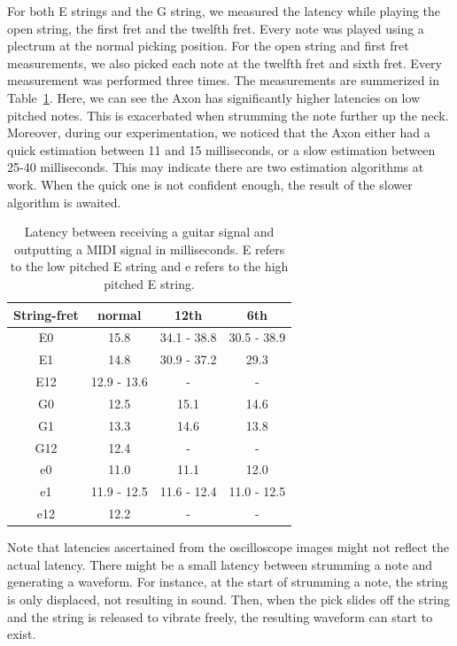 \documentclass[a4paper,10pt,twocolumn]{article}
\begin{document}
For both E strings and the G string, we measured the latency while playing the open string, the first fret and the twelfth fret. Every note was played using a plectrum at the normal picking position. For the open string and first fret measurements, we also picked each note at the twelfth fret and sixth fret. Every measurement was performed three times. The measurements are summerized in Table~\ref{tab:osc_results}. Here, we can see the Axon has significantly higher latencies on low pitched notes. This is exacerbated when strumming the note further up the neck. Moreover, during our experimentation, we noticed that the Axon either had a quick estimation between 11 and 15 milliseconds, or a slow estimation between 25-40 milliseconds. This may indicate there are two estimation algorithms at work. When the quick one is not confident enough, the result of the slower algorithm is awaited.
\begin{table}[h]
    \centering
    \begin{tabular}{c|ccc}
        String-fret & normal & 12th & 6th \\
        \hline
        E0  & 15.8 & 34.1 - 38.8 & 30.5 - 38.9 \\
        E1  & 14.8 & 30.9 - 37.2 & 29.3 \\
        E12 & 12.9 - 13.6 & - & - \\
        G0  & 12.5 & 15.1 & 14.6 \\
        G1  & 13.3 & 14.6 & 13.8 \\
        G12 & 12.4 & - & - \\
        e0  & 11.0 & 11.1 & 12.0 \\
        e1  & 11.9 - 12.5 & 11.6 - 12.4 & 11.0 - 12.5 \\
        e12 & 12.2 & - & -
    \end{tabular}
    \caption{Latency between receiving a guitar signal and outputting a MIDI signal in milliseconds. E refers to the low pitched E string and e refers to the high pitched E string.}
    \label{tab:osc_results}
\end{table}

Note that latencies ascertained from the oscilloscope images might not reflect the actual latency. There might be a small latency between strumming a note and generating a waveform. For instance, at the start of strumming a note, the string is only displaced, not resulting in sound. Then, when the pick slides off the string and the string is released to vibrate freely, the resulting waveform can start to exist.
\end{document}
